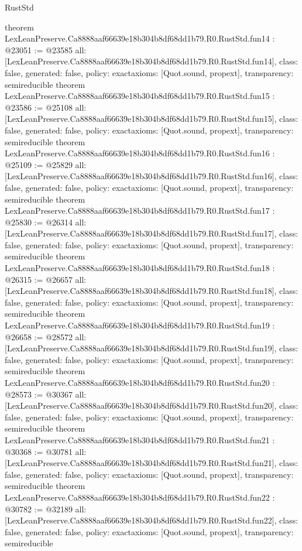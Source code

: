 \begin{lexlean}{RustStd}
\begin{coremodule}
{}
theorem LexLeanPreserve.Ca8888aaf66639e18b304b8df68dd1b79.R0.RustStd.fun14 : @23051 := @23585 {
  all: [LexLeanPreserve.Ca8888aaf66639e18b304b8df68dd1b79.R0.RustStd.fun14],
  class: false,
  generated: false,
  policy: exact{axioms: [Quot.sound, propext]},
  transparency: semireducible
}
theorem LexLeanPreserve.Ca8888aaf66639e18b304b8df68dd1b79.R0.RustStd.fun15 : @23586 := @25108 {
  all: [LexLeanPreserve.Ca8888aaf66639e18b304b8df68dd1b79.R0.RustStd.fun15],
  class: false,
  generated: false,
  policy: exact{axioms: [Quot.sound, propext]},
  transparency: semireducible
}
theorem LexLeanPreserve.Ca8888aaf66639e18b304b8df68dd1b79.R0.RustStd.fun16 : @25109 := @25829 {
  all: [LexLeanPreserve.Ca8888aaf66639e18b304b8df68dd1b79.R0.RustStd.fun16],
  class: false,
  generated: false,
  policy: exact{axioms: [Quot.sound, propext]},
  transparency: semireducible
}
theorem LexLeanPreserve.Ca8888aaf66639e18b304b8df68dd1b79.R0.RustStd.fun17 : @25830 := @26314 {
  all: [LexLeanPreserve.Ca8888aaf66639e18b304b8df68dd1b79.R0.RustStd.fun17],
  class: false,
  generated: false,
  policy: exact{axioms: [Quot.sound, propext]},
  transparency: semireducible
}
theorem LexLeanPreserve.Ca8888aaf66639e18b304b8df68dd1b79.R0.RustStd.fun18 : @26315 := @26657 {
  all: [LexLeanPreserve.Ca8888aaf66639e18b304b8df68dd1b79.R0.RustStd.fun18],
  class: false,
  generated: false,
  policy: exact{axioms: [Quot.sound, propext]},
  transparency: semireducible
}
theorem LexLeanPreserve.Ca8888aaf66639e18b304b8df68dd1b79.R0.RustStd.fun19 : @26658 := @28572 {
  all: [LexLeanPreserve.Ca8888aaf66639e18b304b8df68dd1b79.R0.RustStd.fun19],
  class: false,
  generated: false,
  policy: exact{axioms: [Quot.sound, propext]},
  transparency: semireducible
}
theorem LexLeanPreserve.Ca8888aaf66639e18b304b8df68dd1b79.R0.RustStd.fun20 : @28573 := @30367 {
  all: [LexLeanPreserve.Ca8888aaf66639e18b304b8df68dd1b79.R0.RustStd.fun20],
  class: false,
  generated: false,
  policy: exact{axioms: [Quot.sound, propext]},
  transparency: semireducible
}
theorem LexLeanPreserve.Ca8888aaf66639e18b304b8df68dd1b79.R0.RustStd.fun21 : @30368 := @30781 {
  all: [LexLeanPreserve.Ca8888aaf66639e18b304b8df68dd1b79.R0.RustStd.fun21],
  class: false,
  generated: false,
  policy: exact{axioms: [Quot.sound, propext]},
  transparency: semireducible
}
theorem LexLeanPreserve.Ca8888aaf66639e18b304b8df68dd1b79.R0.RustStd.fun22 : @30782 := @32189 {
  all: [LexLeanPreserve.Ca8888aaf66639e18b304b8df68dd1b79.R0.RustStd.fun22],
  class: false,
  generated: false,
  policy: exact{axioms: [Quot.sound, propext]},
  transparency: semireducible
}
\end{coremodule}
\end{lexlean}
